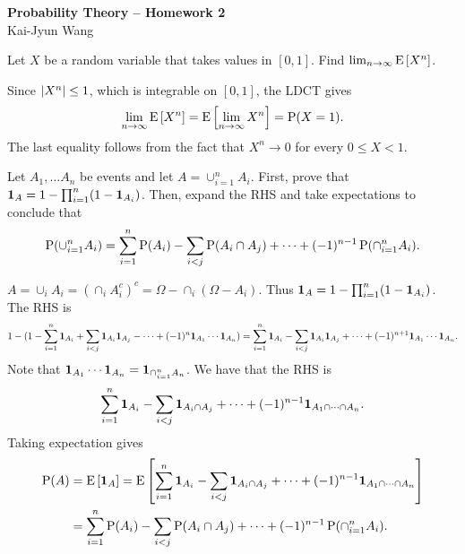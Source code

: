 \documentclass[a4paper, 12pt]{article}
\begin{document}
 

\begin{center}
    \Large
    \textbf{Probability Theory  -- Homework 2}\\
    \large{Kai-Jyun Wang}
\end{center}

\begin{exercise}{2.1}
    Let $X$ be a random variable that takes values in $[0,1]$. 
    Find $\lim_{n\to\infty}\E\sbrc{X^n}$. 
\end{exercise}
\begin{solution}
    Since $\abs{X^n}\leq 1$, which is integrable on $[0,1]$, 
    the LDCT gives 
    \begin{equation*}
        \lim_{n\to\infty}\E\sbrc{X^n} = \E\sbrc{\lim_{n\to\infty} X^n} 
        = \P(X = 1). 
    \end{equation*}
    The last equality follows from the fact that $X^n\to 0$ for 
    every $0\leq X < 1$. 
\end{solution}

\begin{exercise}{2.2}
    Let $A_1,\ldots A_n$ be events and let $A = \cup_{i=1}^n A_i$. 
    First, prove that $\one_A = 1 - \prod_{i=1}^n(1 - \one_{A_i})$. 
    Then, expand the RHS and take expectations to conclude that 
    \begin{equation*}
        \P(\cup_{i=1}^n A_i) = \sum_{i=1}^n \P(A_i) - \sum_{i<j}\P(A_i\cap A_j) 
        + \cdots + (-1)^{n-1}\P(\cap_{i=1}^n A_i). 
    \end{equation*} 
\end{exercise}
\begin{solution}
    $A = \cup_i A_i = (\cap_i A_i^c)^c = \Omega - \cap_i (\Omega - A_i)$. 
    Thus $\one_A = 1 - \prod_{i=1}^n (1 - \one_{A_i})$. The RHS is 
    \begin{equation*}
        1 - (1 - \sum_{i=1}^n\one_{A_i} + \sum_{i<j}\one_{A_i}\one_{A_j} - \cdots + (-1)^n\one_{A_1}\cdots\one_{A_n}) 
        = \sum_{i=1}^n\one_{A_i} - \sum_{i<j}\one_{A_i}\one_{A_j} + \cdots + (-1)^{n+1}\one_{A_1}\cdots\one_{A_n}. 
    \end{equation*}
    Note that $\one_{A_1}\cdots\one_{A_n} = \one_{\cap_{i=1}^n A_n}$. 
    We have that the RHS is 
    \begin{equation*}
        \sum_{i=1}^n\one_{A_i} - \sum_{i<j}\one_{A_i\cap A_j} + \cdots + (-1)^{n-1}\one_{A_1\cap\cdots\cap A_n}. 
    \end{equation*} 
    Taking expectation gives 
    \begin{equation*}
        \begin{split}
            \P(A) &= \E\sbrc{\one_A} = \E\sbrc{\sum_{i=1}^n\one_{A_i} - \sum_{i<j}\one_{A_i\cap A_j} + \cdots + (-1)^{n-1}\one_{A_1\cap\cdots\cap A_n}} \\ 
            &= \sum_{i=1}^n \P(A_i) - \sum_{i<j}\P(A_i\cap A_j) 
            + \cdots + (-1)^{n-1}\P(\cap_{i=1}^n A_i). 
        \end{split}
    \end{equation*}
\end{solution}
\end{document}
